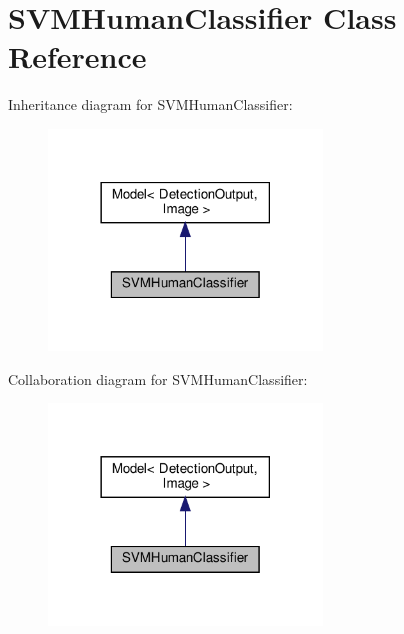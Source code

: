 \hypertarget{classSVMHumanClassifier}{}\section{S\+V\+M\+Human\+Classifier Class Reference}
\label{classSVMHumanClassifier}


Inheritance diagram for S\+V\+M\+Human\+Classifier\+:
\nopagebreak
\begin{figure}[H]
\begin{center}
\leavevmode
\includegraphics[width=206pt]{classSVMHumanClassifier__inherit__graph}
\end{center}
\end{figure}


Collaboration diagram for S\+V\+M\+Human\+Classifier\+:
\nopagebreak
\begin{figure}[H]
\begin{center}
\leavevmode
\includegraphics[width=206pt]{classSVMHumanClassifier__coll__graph}
\end{center}
\end{figure}
